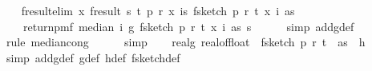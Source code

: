 \begin{isabellebody}
\isanewline
\ \ \isamarkupfalse%
\ f{}{\isacharunderscore}{\kern0pt}result{\isacharunderscore}{\kern0pt}elim{\isacharcolon}{\kern0pt}\ {\isachardoublequoteopen}{\isasymAnd}x{\isachardot}{\kern0pt}\ f{}{\isacharunderscore}{\kern0pt}result\ {\isacharparenleft}{\kern0pt}s{\isacharcomma}{\kern0pt}\ t{\isacharcomma}{\kern0pt}\ p{\isacharcomma}{\kern0pt}\ r{\isacharcomma}{\kern0pt}\ x{\isacharcomma}{\kern0pt}\ {\isasymlambda}i{\isasymin}{\isacharbraceleft}{\kern0pt}{}{\isachardot}{\kern0pt}{\isachardot}{\kern0pt}{\isacharless}{\kern0pt}s{\isacharbraceright}{\kern0pt}{\isachardot}{\kern0pt}\ f{}{\isacharunderscore}{\kern0pt}sketch\ p\ r\ t\ {\isacharparenleft}{\kern0pt}x\ i{\isacharparenright}{\kern0pt}\ as{\isacharparenright}{\kern0pt}\ {\isacharequal}{\kern0pt}\isanewline
\ \ \ \ return{\isacharunderscore}{\kern0pt}pmf\ {\isacharparenleft}{\kern0pt}median\ {\isacharparenleft}{\kern0pt}{\isasymlambda}i{\isachardot}{\kern0pt}\ g\ {\isacharparenleft}{\kern0pt}f{}{\isacharunderscore}{\kern0pt}sketch\ p\ r\ t\ {\isacharparenleft}{\kern0pt}x\ i{\isacharparenright}{\kern0pt}\ as{\isacharparenright}{\kern0pt}{\isacharparenright}{\kern0pt}\ s{\isacharparenright}{\kern0pt}{\isachardoublequoteclose}\isanewline
\ \ \ \ \isamarkupfalse%
\ {\isacharparenleft}{\kern0pt}simp\ add{\isacharcolon}{\kern0pt}g{\isacharunderscore}{\kern0pt}def{\isacharparenright}{\kern0pt}\isanewline
\ \ \ \ \isamarkupfalse%
\ {\isacharparenleft}{\kern0pt}rule\ median{\isacharunderscore}{\kern0pt}cong{\isacharparenright}{\kern0pt}\isanewline
\ \ \ \ \isamarkupfalse%
\ simp\isanewline
\isanewline
\ \ \isamarkupfalse%
\ real{\isacharunderscore}{\kern0pt}g{\isacharunderscore}{\kern0pt}{}{\isacharcolon}{\kern0pt}{\isachardoublequoteopen}{\isasymAnd}{\isasymomega}{\isachardot}{\kern0pt}\ real{\isacharunderscore}{\kern0pt}of{\isacharunderscore}{\kern0pt}float\ {\isacharbackquote}{\kern0pt}\ f{}{\isacharunderscore}{\kern0pt}sketch\ p\ r\ t\ {\isasymomega}\ as\ {\isacharequal}{\kern0pt}\ h\ {\isasymomega}{\isachardoublequoteclose}\ \isanewline
\ \ \ \ \isamarkupfalse%
\ {\isacharparenleft}{\kern0pt}simp\ add{\isacharcolon}{\kern0pt}g{\isacharunderscore}{\kern0pt}def\ g{\isacharprime}{\kern0pt}{\isacharunderscore}{\kern0pt}def\ h{\isacharunderscore}{\kern0pt}def\ f{}{\isacharunderscore}{\kern0pt}sketch{\isacharunderscore}{\kern0pt}def{\isacharparenright}{\kern0pt}\isanewline
\ \ \ \ \isamarkupfalse%

\end{isabellebody}
